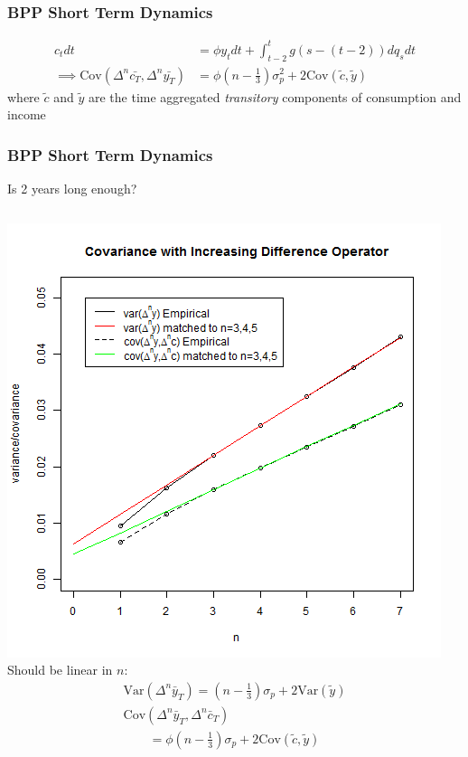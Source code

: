 \documentclass{beamer}
\begin{document}
\frame
{
	\frametitle{BPP Short Term Dynamics}
	\begin{align*}
	c_t dt &= \phi y_t dt + \int_{t-2}^{t} g(s-(t-2))dq_s dt \\
	\implies \mathrm{Cov}(\Delta^n \bar{c_T},\Delta^n \bar{y_T} ) &= \phi (n-\frac{1}{3}) \sigma^2_p + 2 \mathrm{Cov}(\tilde{c},\tilde{y})
	\end{align*}
	where $\tilde{c}$ and $\tilde{y}$ are the time aggregated \textit{transitory} components of consumption and income	\\
}
\frame
{
	\frametitle{BPP Short Term Dynamics}
	Is 2 years long enough?
    \begin{columns}
	\centering
	\includegraphics[scale=0.35]{../Figures/IncreasingDiff.png}
	Should be linear in $n$:
	\begin{align*}
		\mathrm{Var}(\Delta^n \bar{y}_T) = (n-\frac{1}{3})\sigma_p + 2\mathrm{Var}(\tilde{y}) \\[5pt]
		\mathrm{Cov}(\Delta^n \bar{y}_T, \Delta^n \bar{c}_T) \qquad \qquad \qquad \\
		\qquad = \phi(n-\frac{1}{3})\sigma_p + 2\mathrm{Cov}(\tilde{c},\tilde{y})
	\end{align*}
	\end{columns} 
}
\frame
\end{document}
